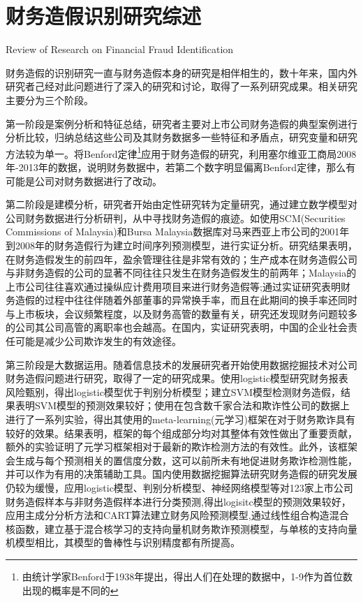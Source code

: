 \section{财务造假识别研究综述}{Review of Research on Financial Fraud Identification}

财务造假的识别研究一直与财务造假本身的研究是相伴相生的，数十年来，国内外研究者己经对此问题进行了深入的研究和讨论，取得了一系列研究成果。相关研究主要分为三个阶段。

第一阶段是案例分析和特征总结，研究者主要对上市公司财务造假的典型案例进行分析比较，归纳总结这些公司及其财务数据多一些特征和矛盾点，研究变量和研究方法较为单一。\citep{pavlovic_fraud_2019}将Benford定律\footnote{由统计学家Benford于1938年提出，得出人们在处理的数据中，1-9作为首位数出现的概率是不同的}应用于财务造假的研究，利用塞尔维亚工商局2008年-2013年的数据，说明财务数据中，若第二个数字明显偏离Benford定律，那么有可能是公司对财务数据进行了改动。

第二阶段是建模分析，研究者开始由定性研究转为定量研究，通过建立数学模型对公司财务数据进行分析研判，从中寻找财务造假的痕迹。如\citep{md_nasir_real_2018}使用SCM(Securities Commissions of Malaysia)和Bursa Malaysia数据库对马来西亚上市公司的2001年到2008年的财务造假行为建立时间序列预测模型，进行实证分析。研究结果表明，在财务造假发生的前四年，盈余管理往往是非常有效的；生产成本在财务造假公司与非财务造假的公司的显著不同往往只发生在财务造假发生的前两年；Malaysia的上市公司往往喜欢通过操纵应计费用项目来进行财务造假等;\citep{gao_go_2017}通过实证研究表明财务造假的过程中往往伴随着外部董事的异常换手率，而且在此期间的换手率还同时与上市板块，会议频繁程度，以及财务高管的数量有关，研究还发现财务问题较多的公司其公司高管的离职率也会越高。在国内，\citep{liao_corporate_2019}实证研究表明，中国的企业社会责任可能是减少公司欺诈发生的有效途径。

第三阶段是大数据运用。随着信息技术的发展研究者开始使用数据挖掘技术对公司财务造假问题进行研究，取得了一定的研究成果。\citep{tseng_quadratic_2005}使用logistic模型研究财务报表风险甄别，得出logistic模型优于判别分析模型；\citep{chen_enhancement_2017}建立SVM模型检测财务造假，结果表明SVM模型的预测效果较好；\citep{abbasi_metafraud:_2012}使用在包含数千家合法和欺诈性公司的数据上进行了一系列实验，得出其使用的meta-learning(元学习)框架在对于财务欺诈具有较好的效果。结果表明，框架的每个组成部分均对其整体有效性做出了重要贡献，额外的实验证明了元学习框架相对于最新的欺诈检测方法的有效性。此外，该框架会生成与每个预测相关的置信度分数，这可以前所未有地促进财务欺诈检测性能，并可以作为有用的决策辅助工具。国内使用数据挖掘算法研究财务造假的研究发展仍较为缓慢，\citep{LU}应用logistic模型、判别分析模型、神经网络模型等对123家上市公司财务造假样本与非财务造假样本进行分类预测,得出logisitc模型的预测效果较好，\citep{MingLi}应用主成分分析方法和CART算法建立财务风险预测模型,\citep{mixedcore}通过线性组合构造混合核函数，建立基于混合核学习的支持向量机财务欺诈预测模型，与单核的支持向量机模型相比，其模型的鲁棒性与识别精度都有所提高。

